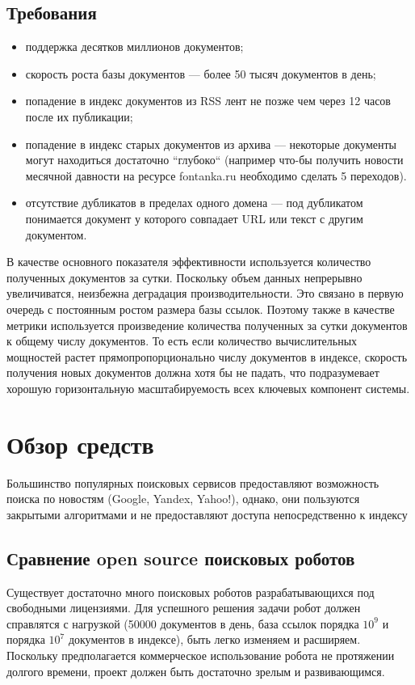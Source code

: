 \section{Требования}
\begin{itemize}
 \item поддержка десятков миллионов документов;
 \item скорость роста базы документов --- более 50 тысяч документов в день;
 \item попадение в индекс документов из RSS лент не позже чем через 12 часов после их публикации;
 \item попадение в индекс старых документов из архива --- некоторые документы могут находиться достаточно ``глубоко`` (например что-бы получить новости месячной давности на ресурсе fontanka.ru необходимо сделать 5 переходов).
 \item отсутствие дубликатов в пределах одного домена --- под дубликатом понимается документ у которого совпадает URL или текст с другим документом.
\end{itemize}

В качестве основного показателя эффективности используется количество полученных документов за сутки.
 Поскольку объем данных непрерывно увеличиватся, неизбежна деградация производительности. Это связано в первую очередь с постоянным ростом размера базы ссылок.
 Поэтому также в качестве метрики используется произведение количества полученных за сутки документов к общему числу документов. То есть если количество вычислительных мощностей растет прямопропорционально числу документов в индексе, скорость получения новых документов должна хотя бы не падать, что подразумевает хорошую горизонтальную масштабируемость всех ключевых компонент системы.



\chapter{Обзор средств}
Большинство популярных поисковых сервисов предоставляют возможность поиска по новостям (Google, Yandex, Yahoo!), однако, они пользуются закрытыми алгоритмами и не предоставляют доступа непосредственно к индексу
\section{Сравнение open source поисковых роботов}
Существует достаточно много поисковых роботов разрабатывающихся под свободными лицензиями. Для успешного решения задачи робот должен справлятся с нагрузкой (50000 документов в день, база ссылок порядка $10^{9}$ и порядка $10^7$ документов в индексе), быть легко изменяем и расширяем. Поскольку предполагается коммерческое использование робота не протяжении долгого времени, проект должен быть достаточно зрелым и развивающимся.
